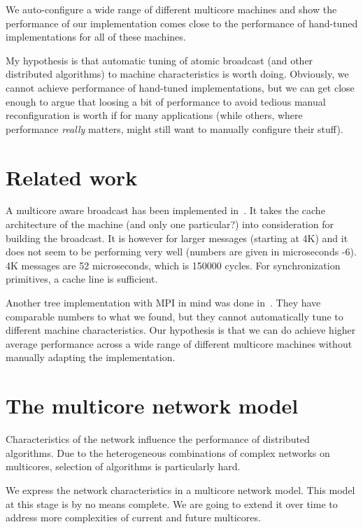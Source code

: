 \documentclass{article}
\begin{document}
We auto-configure a wide range of different multicore machines and
show the performance of our implementation comes close to the
performance of hand-tuned implementations for all of these machines.

My hypothesis is that automatic tuning of atomic broadcast (and other
distributed algorithms) to machine characteristics is worth
doing. Obviously, we cannot achieve performance of hand-tuned
implementations, but we can get close enough to argue that loosing a
bit of performance to avoid tedious manual reconfiguration is worth if
for many applications (while others, where performance \emph{really}
matters, might still want to manually configure their stuff).

\section{Related work}

A multicore aware broadcast has been implemented in~\cite{Tu2008}. It
takes the cache architecture of the machine (and only one particular?)
into consideration for building the broadcast. It is however for
larger messages (starting at 4K) and it does not seem to be performing
very well (numbers are given in microseconds -6). 4K messages are 52
microseconds, which is 150000 cycles. For synchronization primitives,
a cache line is sufficient.

Another tree implementation with MPI in mind was done
in~\cite{Graham2008}. They have comparable numbers to what we found,
but they cannot automatically tune to different machine
characteristics. Our hypothesis is that we can do achieve higher
average performance across a wide range of different multicore
machines without manually adapting the implementation.

\section{The multicore network model}

Characteristics of the network influence the performance of
distributed algorithms. Due to the heterogeneous combinations of
complex networks on multicores, selection of algorithms is
particularly hard.

We express the network characteristics in a multicore network
model. This model at this stage is by no means complete. We are going to
extend it over time to address more complexities of current and future
multicores.
\end{document}
